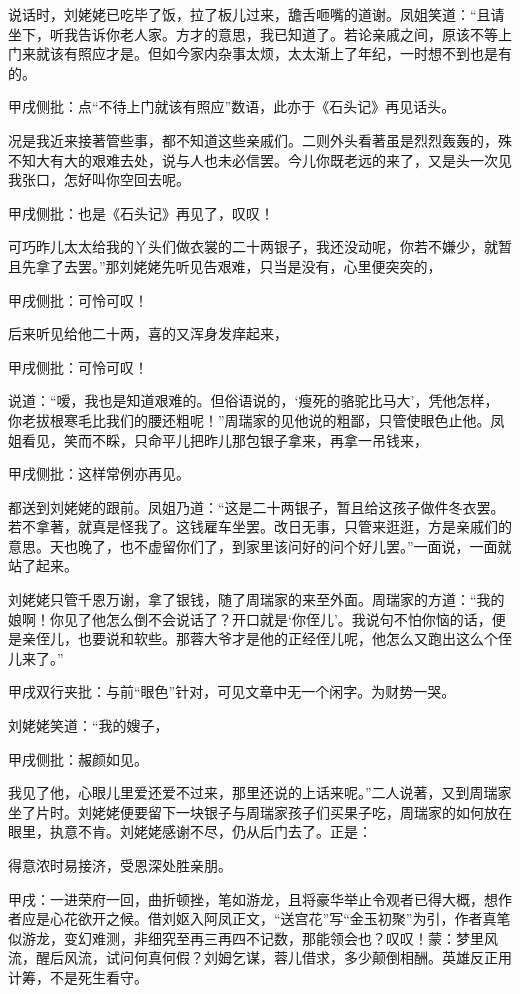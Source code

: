 \begin{parag}
    说话时，刘姥姥已吃毕了饭，拉了板儿过来，舚舌咂嘴的道谢。凤姐笑道：“且请坐下，听我告诉你老人家。方才的意思，我已知道了。若论亲戚之间，原该不等上门来就该有照应才是。但如今家内杂事太烦，太太渐上了年纪，一时想不到也是有的。\begin{note}甲戌侧批：点“不待上门就该有照应”数语，此亦于《石头记》再见话头。\end{note}况是我近来接著管些事，都不知道这些亲戚们。二则外头看著虽是烈烈轰轰的，殊不知大有大的艰难去处，说与人也未必信罢。今儿你既老远的来了，又是头一次见我张口，怎好叫你空回去呢。\begin{note}甲戌侧批：也是《石头记》再见了，叹叹！\end{note}可巧昨儿太太给我的丫头们做衣裳的二十两银子，我还没动呢，你若不嫌少，就暂且先拿了去罢。”那刘姥姥先听见告艰难，只当是没有，心里便突突的，\begin{note}甲戌侧批：可怜可叹！\end{note}后来听见给他二十两，喜的又浑身发痒起来，\begin{note}甲戌侧批：可怜可叹！\end{note}说道：“嗳，我也是知道艰难的。但俗语说的，‘瘦死的骆驼比马大’，凭他怎样，你老拔根寒毛比我们的腰还粗呢！”周瑞家的见他说的粗鄙，只管使眼色止他。凤姐看见，笑而不睬，只命平儿把昨儿那包银子拿来，再拿一吊钱来，\begin{note}甲戌侧批：这样常例亦再见。\end{note}都送到刘姥姥的跟前。凤姐乃道：“这是二十两银子，暂且给这孩子做件冬衣罢。若不拿著，就真是怪我了。这钱雇车坐罢。改日无事，只管来逛逛，方是亲戚们的意思。天也晚了，也不虚留你们了，到家里该问好的问个好儿罢。”一面说，一面就站了起来。
\end{parag}


\begin{parag}
    刘姥姥只管千恩万谢，拿了银钱，随了周瑞家的来至外面。周瑞家的方道：“我的娘啊！你见了他怎么倒不会说话了？开口就是‘你侄儿’。我说句不怕你恼的话，便是亲侄儿，也要说和软些。那蓉大爷才是他的正经侄儿呢，他怎么又跑出这么个侄儿来了。”\begin{note}甲戌双行夹批：与前“眼色”针对，可见文章中无一个闲字。为财势一哭。\end{note}刘姥姥笑道：“我的嫂子，\begin{note}甲戌侧批：赧颜如见。\end{note}我见了他，心眼儿里爱还爱不过来，那里还说的上话来呢。”二人说著，又到周瑞家坐了片时。刘姥姥便要留下一块银子与周瑞家孩子们买果子吃，周瑞家的如何放在眼里，执意不肯。刘姥姥感谢不尽，仍从后门去了。正是：
\end{parag}


\begin{poem}
    \begin{pl}得意浓时易接济，受恩深处胜亲朋。
    \end{pl}
\end{poem}


\begin{parag}
    \begin{note}甲戌：一进荣府一回，曲折顿挫，笔如游龙，且将豪华举止令观者已得大概，想作者应是心花欲开之候。借刘妪入阿凤正文，“送宫花”写“金玉初聚”为引，作者真笔似游龙，变幻难测，非细究至再三再四不记数，那能领会也？叹叹！蒙：梦里风流，醒后风流，试问何真何假？刘姆乞谋，蓉儿借求，多少颠倒相酬。英雄反正用计筹，不是死生看守。\end{note}
\end{parag}
